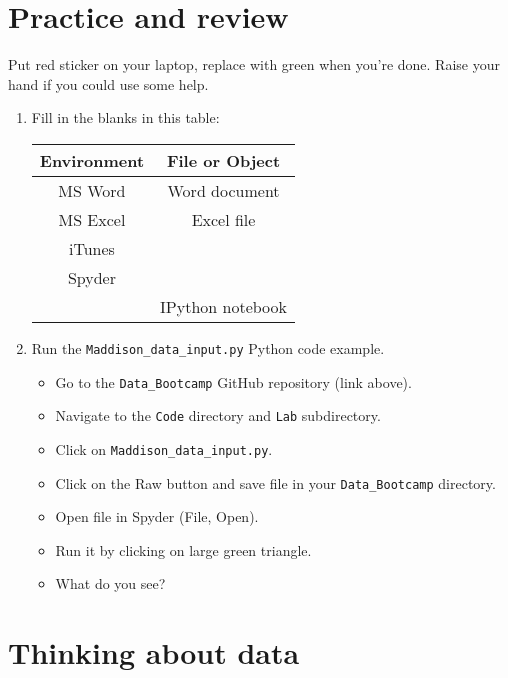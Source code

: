 \documentclass[11pt]{article}
\begin{document}
\section*{Practice and review}


Put red sticker on your laptop, replace with green when you're done.  Raise your hand
if you could use some help. 

\begin{enumerate} 

\item Fill in the blanks in this table:  

\begin{center} 
\begin{tabular}{cc} 
\toprule 
Environment & File or Object \\
\midrule 
MS Word  & Word document  \\
MS Excel & Excel file     \\
iTunes & \\
Spyder   &                \\
         & IPython notebook \\
\bottomrule 
\end{tabular}
\end{center}


\item Run the \verb|Maddison_data_input.py| Python code example.  
\begin{itemize}
\item Go to the \verb|Data_Bootcamp| GitHub repository (link above).  
\item Navigate to the {\tt Code} directory and {\tt Lab} subdirectory.
\item Click on \verb|Maddison_data_input.py|.
\item Click on the Raw button and save file in your \verb|Data_Bootcamp| 
directory.
\item Open file in Spyder (File, Open).
\item Run it by clicking on large green triangle.
\item What do you see?
\end{itemize}

\end{enumerate} 


\section*{Thinking about data}
\end{document}
